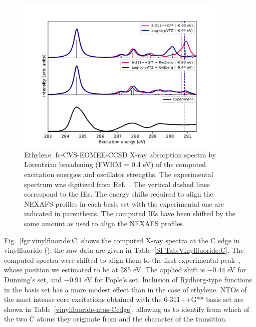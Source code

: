 \documentclass[journal=jctcce,manuscript=article]{achemso}
\begin{document}
\begin{figure}
  \includegraphics[width=0.9\textwidth]{Spectra/C2H4.pdf}
  \caption{Ethylene. fc-CVS-EOMEE-CCSD X-ray absorption spectra by  Lorentzian broadening (FWHM = 0.4 eV) of the computed excitation energies and oscillator strengths. The  experimental spectrum was digitized from Ref.~. The vertical dashed lines correspond to the IEs.
The energy shifts 
required to align the NEXAFS profiles in each basis set with the
experimental one are indicated in parenthesis. The computed IEs have been shifted by the same amount as used to align the NEXAFS profiles.
\label{fgr:ethylene}}
\end{figure}



Fig.~\ref{fgr:vinylfluoride:C} shows the computed X-ray spectra 
at the C edge in vinylfluoride (); the raw data are given in Table~\ref{SI-Tab:Vinylfluoride:C}.
The computed spectra were shifted to align them to the first experimental peak~\cite{NEXAFS_C2H4_CH2CHF_Exp}, whose position we estimated to be at 285 eV. The applied shift is $-0.44$ eV
for Dunning's set, and $-0.91$ eV for Pople's set. 
Inclusion of Rydberg-type functions in the basis set has a more 
modest effect than in the case of ethylene.
NTOs of the most intense core excitations obtained with the
6-311++G** basis set are shown in Table~\ref{vinylfluoride-ntos-Cedge}, 
allowing us to identify from which of the two C atoms they originate from and the character of the transition. 
\end{document}
